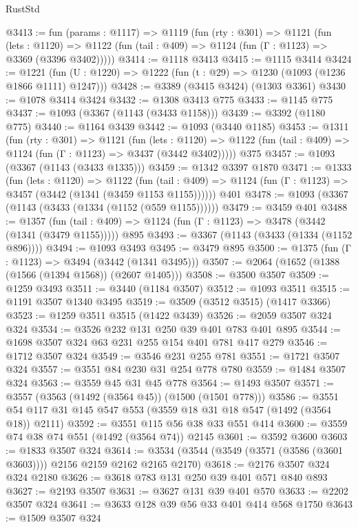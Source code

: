 \begin{lexlean}{RustStd}
\begin{coremodule}
{\begin{coremodule}
{{{{{{{{@3413 := fun (params : @1117) =>
  @1119
    (fun (rty : @301) =>
    @1121
      (fun (lets : @1120) =>
      @1122 (fun (tail : @409) => @1124 (fun (Γ : @1123) => @3369 (@3396 @3402)))))
@3414 := @1118 @3413
@3415 := @1115 @3414
@3424 := @1221 (fun (U : @1220) => @1222 (fun (t : @29) => @1230 (@1093 (@1236 @1866 @1111) @1247)))
@3428 := @3389 (@3415 @3424) (@1303 @3361)
@3430 := @1078 @3414 @3424
@3432 := @1308 @3413 @775
@3433 := @1145 @775
@3437 := @1093 (@3367 (@1143 (@3433 @1158)))
@3439 := @3392 (@1180 @775)
@3440 := @1164 @3439
@3442 := @1093 (@3440 @1185)
@3453 := @1311
    (fun (rty : @301) =>
    @1121
      (fun (lets : @1120) =>
      @1122 (fun (tail : @409) => @1124 (fun (Γ : @1123) => @3437 (@3442 @3402)))))
    @375
@3457 := @1093 (@3367 (@1143 (@3433 @1335)))
@3459 := @1342 @3397 @1870
@3471 := @1333
    (fun (lets : @1120) =>
    @1122
      (fun (tail : @409) => @1124 (fun (Γ : @1123) => @3457 (@3442 (@1341 (@3459 @1153 @1155))))))
    @401
@3478 := @1093 (@3367 (@1143 (@3433 (@1334 (@1152 (@559 @1155))))))
@3479 := @3459 @401
@3488 := @1357
    (fun (tail : @409) => @1124 (fun (Γ : @1123) => @3478 (@3442 (@1341 (@3479 @1155)))))
    @895
@3493 := @3367 (@1143 (@3433 (@1334 (@1152 @896))))
@3494 := @1093 @3493
@3495 := @3479 @895
@3500 := @1375 (fun (Γ : @1123) => @3494 (@3442 (@1341 @3495)))
@3507 := @2064 (@1652 (@1388 (@1566 (@1394 @1568)) (@2607 @1405)))
@3508 := @3500 @3507
@3509 := @1259 @3493
@3511 := @3440 (@1184 @3507)
@3512 := @1093 @3511
@3515 := @1191 @3507 @1340 @3495
@3519 := @3509 (@3512 @3515) (@1417 @3366)
@3523 := @1259 @3511 @3515 (@1422 @3439)
@3526 := @2059 @3507 @324 @324
@3534 := @3526 @232 @131 @250 @39 @401 @783 @401 @895
@3544 := @1698 @3507 @324 @63 @231 @255 @154 @401 @781 @417 @279
@3546 := @1712 @3507 @324
@3549 := @3546 @231 @255 @781
@3551 := @1721 @3507 @324
@3557 := @3551 @84 @230 @31 @254 @778 @780
@3559 := @1484 @3507 @324
@3563 := @3559 @45 @31 @45 @778
@3564 := @1493 @3507
@3571 := @3557 (@3563 (@1492 (@3564 @45)) (@1500 (@1501 @778)))
@3586 := @3551 @54 @117 @31 @145 @547 @553 (@3559 @18 @31 @18 @547 (@1492 (@3564 @18)) @2111)
@3592 := @3551 @115 @56 @38 @33 @551 @414
@3600 := @3559 @74 @38 @74 @551 (@1492 (@3564 @74)) @2145
@3601 := @3592 @3600
@3603 := @1833 @3507 @324
@3614 := @3534 (@3544 (@3549 (@3571 (@3586 (@3601 @3603)))) @2156 @2159 @2162 @2165 @2170)
@3618 := @2176 @3507 @324 @324 @2180
@3626 := @3618 @783 @131 @250 @39 @401 @571 @840 @893
@3627 := @2193 @3507
@3631 := @3627 @131 @39 @401 @570
@3633 := @2202 @3507 @324
@3641 := @3633 @128 @39 @56 @33 @401 @414 @568 @1750
@3643 := @1509 @3507 @324
}}}}}}}}
\end{coremodule}}
\end{coremodule}
\end{lexlean}
